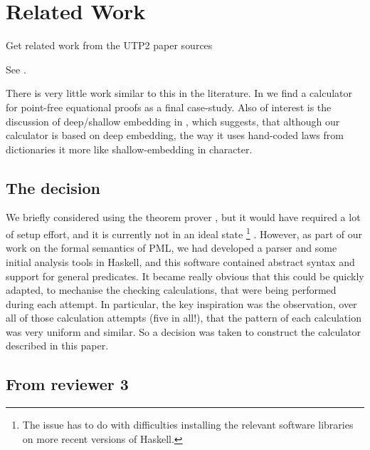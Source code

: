 \section{Related Work}\label{sec:Related}

Get related work from the UTP2 paper sources

See \cite{conf/utp/Butterfield10}.

There is very little work similar to this in the literature.
In \cite{Bird14} we find a calculator
for point-free equational proofs as a final case-study.
Also of interest is the discussion of deep/shallow embedding
in \cite{Gibbons:2014:FDS},
which suggests, that although our calculator is based on deep embedding,
the way it uses hand-coded laws from dictionaries
it more like shallow-embedding in character.



\subsection{The decision}

We briefly considered using the  theorem prover
\cite{DBLP:conf/utp/Butterfield10,DBLP:conf/utp/Butterfield12},
but it would have required a lot of setup effort,
and it is currently not in an ideal state%
\footnote{The issue has to do with difficulties installing
the relevant software libraries
on more recent versions of Haskell.}
.
However, as part of our work on the formal semantics of PML,
we had developed a parser and some initial analysis tools
in Haskell\cite{Haskell2010},
and this software contained abstract syntax and support
for general predicates.
It became really obvious that this could be quickly adapted,
to mechanise the checking calculations, that were being performed
during each attempt.
In particular,
the key inspiration was the observation,
over all of those calculation attempts (five in all!),
that the pattern of each calculation was very uniform and similar.
So a decision was taken to construct the calculator described in this paper.

\subsection{From reviewer 3}

